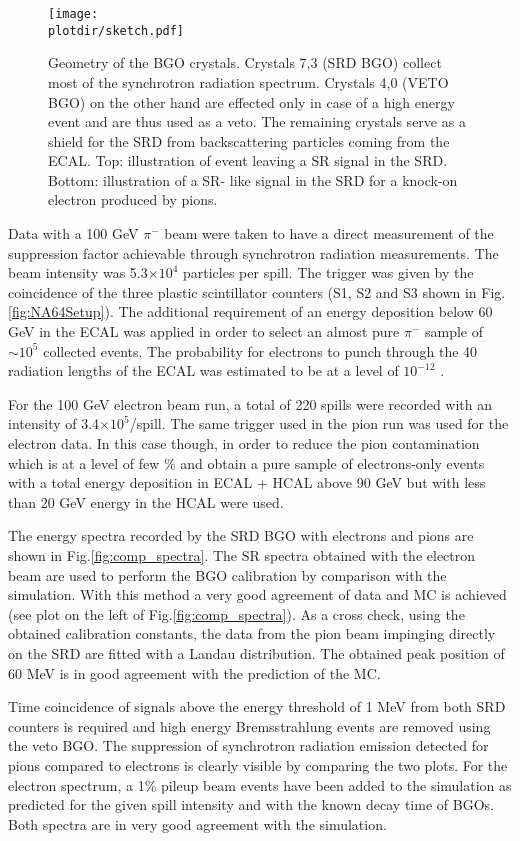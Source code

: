 \begin{figure}[htb!]
  \centering
  \texttt{[image: \\plotdir/sketch.pdf]}
  \caption{Geometry of the BGO crystals. Crystals 7,3 (SRD BGO) collect most of the synchrotron radiation spectrum. Crystals 4,0 (VETO BGO) on the other hand are effected only in case of a high energy event and are thus used as a veto. The remaining crystals serve as a shield for the SRD from backscattering particles coming from the ECAL. Top: illustration of event leaving a SR signal in the SRD. Bottom: illustration of a SR- like signal in the SRD for a knock-on electron produced by pions.}
\label{fig:newgeo}
\end{figure}

Data with a 100 GeV $\pi^-$ beam were taken to have a direct measurement of the suppression factor achievable through synchrotron radiation measurements. The beam intensity was 5.3$\times 10^4$ particles per spill. The trigger was given by the coincidence of the three plastic scintillator counters (S1, S2 and S3 shown in Fig.\ref{fig:NA64Setup}). The additional requirement of an energy deposition below 60 GeV in the ECAL was applied in order to select an almost pure $\pi^-$ sample of $\sim 10^5$ collected events. The probability for electrons to punch through the 40 radiation lengths of the ECAL was estimated to be at a level of $10^{-12}$ \cite{Banerjee:2016tad}. 

For the 100 GeV electron beam run, a total of 220 spills were recorded with an intensity of 3.4$\times 10^5$/spill. 
The same trigger used in the pion run was used for the electron data.
In this case though, in order to reduce the pion contamination which is at a level of few \% and obtain a pure sample of electrons-only events with a total energy deposition in ECAL + HCAL above 90 GeV but with less than 20 GeV energy in the HCAL were used.  


The energy spectra recorded by the SRD BGO with electrons and pions are shown in Fig.\ref{fig:comp_spectra}. The SR spectra obtained with the electron beam are used to perform the BGO calibration by comparison with the simulation. With this method a very good agreement of data and MC is achieved (see plot on the left of Fig.\ref{fig:comp_spectra}). As a cross check, using the obtained calibration constants, the data from the pion beam impinging directly on the SRD are fitted with a Landau distribution. The obtained peak position of 60 MeV is in good agreement with the prediction of the MC. 

Time coincidence of signals above the energy threshold of 1 MeV from both SRD counters is required and high energy Bremsstrahlung events are removed using the veto BGO.
The suppression of synchrotron radiation emission detected for pions compared to electrons is clearly visible by comparing the two plots. For the electron spectrum, a 1\% pileup beam events have been added to the simulation as predicted for the given spill intensity and with the known decay time of BGOs.  Both spectra are in very good agreement with the simulation.

